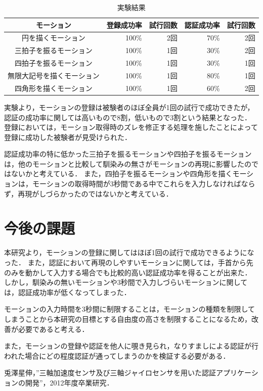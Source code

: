 \documentclass[11pt]{jarticle}
\begin{document}
\begin{table}[htb]
    \begin{center}
        \caption{実験結果}
        \label{result}
        \begin{tabular}{|c|r|r||r|r|} \hline
            モーション & 登録成功率 & 試行回数 & 認証成功率 & 試行回数 \\ \hline \hline
            円を描くモーション & 100\% & 2回 & 70\% & 2回 \\ \hline
            三拍子を振るモーション & 100\% & 1回 & 30\% & 2回 \\ \hline
            四拍子を振るモーション & 100\% & 1回 & 30\% & 1回 \\ \hline
            無限大記号を描くモーション & 100\% & 1回 & 80\% & 1回 \\ \hline
            四角形を描くモーション & 100\% & 1回 & 60\% & 2回 \\ \hline
        \end{tabular}
    \end{center}
\end{table}

実験より，モーションの登録は被験者のほぼ全員が1回の試行で成功できたが，認証の成功率に関しては高いもので8割，低いもので3割という結果となった．
登録においては，モーション取得時のズレを修正する処理を施したことによって登録に成功した被験者が見受けられた．

認証成功率の特に低かった三拍子を振るモーションや四拍子を振るモーションは，他のモーションと比較して馴染みの無さがモーションの再現に影響したのではないかと考えている．
また，四拍子を振るモーションや四角形を描くモーションは，モーションの取得時間が3秒間である中でこれらを入力しなければならず，再現がしづらかったのではないかと考えている．

\section{今後の課題}
本研究より，モーションの登録に関してはほぼ1回の試行で成功できるようになった．
また，認証において再現のしやすいモーションに関しては，手首から先のみを動かして入力する場合でも比較的高い認証成功率を得ることが出来た．
しかし，馴染みの無いモーションや3秒間で入力しづらいモーションに関しては，認証成功率が低くなってしまった．

モーションの入力時間を3秒間に制限することは，モーションの種類を制限してしまうことから本研究の目標とする自由度の高さを制限することになるため，改善が必要であると考える．

また，モーションの登録や認証を他人に覗き見られ，なりすましによる認証が行われた場合にどの程度認証が通ってしまうのかを検証する必要がある．

\begin{thebibliography}{9}
    兎澤星伸，”三軸加速度センサ及び三軸ジャイロセンサを用いた認証アプリケーションの開発”，2012年度卒業研究．
\end{thebibliography}
\end{document}
